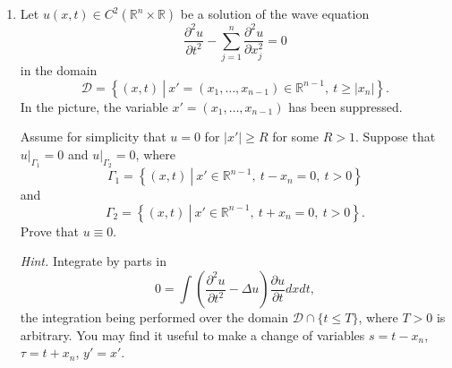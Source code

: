 \documentclass{article}
\begin{document}
\begin{enumerate}
{\em Hint.}  Use Lagrange multipliers.

{\bf Solution}

Let \(u\) be the solution to \(\Delta u = -f\) in \(\Omega\) with \(u = 0\) on \(\partial\Omega\).  We claim that \(E(u)\) is the minimum of \(E\).  Indeed, for any \(v \in C^2(\Omega) \cap C \left( \overline{\Omega} \right)\) with \(v = 0\) on \(\partial\Omega\),
\begin{eqnarray*}
E(u + v) & = & \int_{\Omega} \left( \frac{1}{2} \|\nabla u + \nabla v\|^2 - f (u + v) \right) dx \\
         & = & E(u) + \frac{1}{2} \int_{\Omega} \|\nabla v\|^2 dx + \int_{\Omega} \nabla u \cdot \nabla v dx - \int_{\Omega} f v dx \\
         & = & E(u) + \frac{1}{2} \int_{\Omega} \|\nabla v\|^2 dx - \int_{\Omega} \Delta u v dx - \int_{\Omega} f v dx \\
         & = & E(u) + \frac{1}{2} \int_{\Omega} \|\nabla v\|^2 dx - \int_{\Omega} \left( \Delta u + f \right) v dx \\
         & = & E(u) + \frac{1}{2} \int_{\Omega} \|\nabla v\|^2 dx \\
         & \geq & E(u),
\end{eqnarray*}
where we have used the fact that \(v = 0\) on \(\partial\Omega\) and that \(\Delta u = -f\) in \(\Omega\).  Since the set of such \(u + v\) is exactly the space which is the domain of \(E\), we conclude that \(u\), indeed, minimizes \(E\).



\item Let \(u(x,t) \in C^2 \left( \mathbb{R}^n \times \mathbb{R} \right)\) be a solution of the wave equation
\[\frac{\partial^2 u}{\partial t^2} - \sum_{j = 1}^n \frac{\partial^2 u}{\partial x_j^2} = 0\]
in the domain
\[\mathcal{D} = \left\{ (x,t) \ \left| \ x' = (x_1, \ldots, x_{n - 1}) \in \mathbb{R}^{n - 1}, \ t \geq |x_n| \right. \right\}.\]
In the picture, the variable \(x' = (x_1, \ldots, x_{n - 1})\) has been suppressed.

Assume for simplicity that \(u = 0\) for \(|x'| \geq R\) for some \(R > 1\).  Suppose that \(u|_{\Gamma_1} = 0\) and \(u|_{\Gamma_2} = 0\), where
\[\Gamma_1 = \left\{ (x,t) \ \left| \ x' \in \mathbb{R}^{n - 1}, \ t - x_n = 0, \ t > 0 \right. \right\}\]
and
\[\Gamma_2 = \left\{ (x,t) \ \left| \ x' \in \mathbb{R}^{n - 1}, \ t + x_n = 0, \ t > 0 \right. \right\}.\]
Prove that \(u \equiv 0\).

{\em Hint.}  Integrate by parts in
\[0 = \int \left( \frac{\partial^2 u}{\partial t^2} - \Delta u \right) \frac{\partial u}{\partial t} dx dt,\]
the integration being performed over the domain \(\mathcal{D} \cap \{t \leq T\}\), where \(T > 0\) is arbitrary.  You may find it useful to make a change of variables \(s = t - x_n\), \(\tau = t + x_n\), \(y' = x'\).


\end{enumerate}
\end{document}
